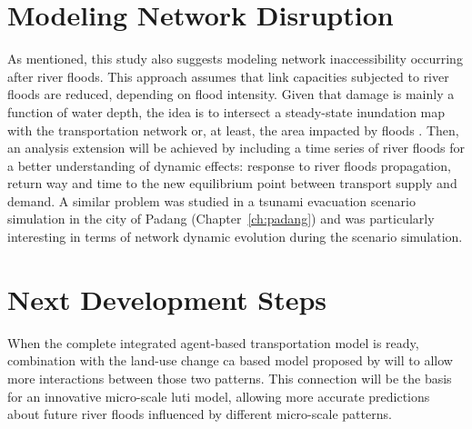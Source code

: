 \section{Modeling Network Disruption}
As mentioned, this study also suggests modeling network inaccessibility occurring after river floods. 
This approach assumes that link capacities subjected to river floods are reduced, depending on flood intensity. 
Given that damage is mainly a function of water depth, the idea is to intersect a steady-state inundation map with the transportation network or, at least, the area impacted by floods \citep[][]{SaadiEtAl_ICTTE_2014}. 
Then, an analysis extension will be achieved by including a time series of river floods for a better understanding of dynamic effects: \eg response to river floods propagation, return way and time to the new equilibrium point between transport supply and demand. 
A similar problem was studied in a tsunami evacuation scenario simulation in the city of Padang \citep[][]{LaemmelGretherNagel2009TimeDependentNetworks} (Chapter~\ref{ch:padang}) and was particularly interesting in terms of network dynamic evolution during the scenario simulation.

\section{Next Development Steps}
When the complete integrated agent-based transportation model is ready, combination with the land-use change \gls{ca} based model proposed by \citet[][]{MustafaEtAl_PES_2014} will to allow more interactions between those two patterns. 
This connection will be the basis for an innovative micro-scale \gls{luti} model, allowing
more accurate predictions about future river floods influenced by different micro-scale patterns.








